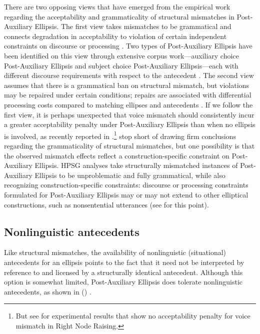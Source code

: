 There are two opposing views that have emerged from the empirical work regarding the acceptability and grammaticality of structural mismatches in Post-Auxiliary Ellipsis. The first view takes mismatches to be grammatical and connects degradation in acceptability to violation of certain independent constraints on discourse \citep{Kehler2002, Miller2011, %
Miller2014, Miller2014a, Miller2014b} or processing \citep{Kim2011}. Two types of Post-Auxiliary Ellipsis have been identified on this view through extensive corpus work---auxiliary choice Post-Auxiliary Ellipsis and subject choice Post-Auxiliary Ellipsis---each with different discourse requirements with respect to the antecedent \citep{Miller2011, Miller2014a, Miller2014b}. The second view assumes that there is a grammatical ban on structural mismatch, but violations may be repaired under certain conditions; repairs are associated with differential processing costs compared to matching ellipses and antecedents \citep{Arregui2006, Grant2012}. If we follow the first view, it is perhaps unexpected that voice mismatch should consistently incur a greater acceptability penalty under Post-Auxiliary Ellipsis than when no ellipsis is involved, as recently reported in \citet{Kim2018}.\footnote{But see \citet{Abeille2016} for experimental results
that show no acceptability penalty for voice mismatch in  Right Node Raising.} \citet{Kim2018} stop short of drawing firm conclusions regarding the grammaticality of structural mismatches, but one possibility is that the observed mismatch effects reflect a construction-specific constraint on Post-Auxiliary Ellipsis. HPSG analyses take structurally mismatched instances of Post-Auxiliary Ellipsis to be unproblematic and fully grammatical, while also recognizing construction-specific constraints: discourse or processing constraints formulated for Post-Auxiliary Ellipsis may or may not extend to other elliptical constructions, such as nonsentential utterances (see \citealt{Abeille2016,Ginzburg2018} for this point).


\subsection{Nonlinguistic antecedents}
\label{sec-nonlinguistic-antecedents}

Like structural mismatches, the availability of nonlinguistic (situational) antecedents for an
ellipsis points to the fact that it need not be interpreted by reference to and licensed by a
structurally identical antecedent. Although this option is somewhat limited, Post-Auxiliary Ellipsis
does tolerate nonlinguistic antecedents, as shown in () \citep[see also][]{Hankamer1976, Schachter1977}.

